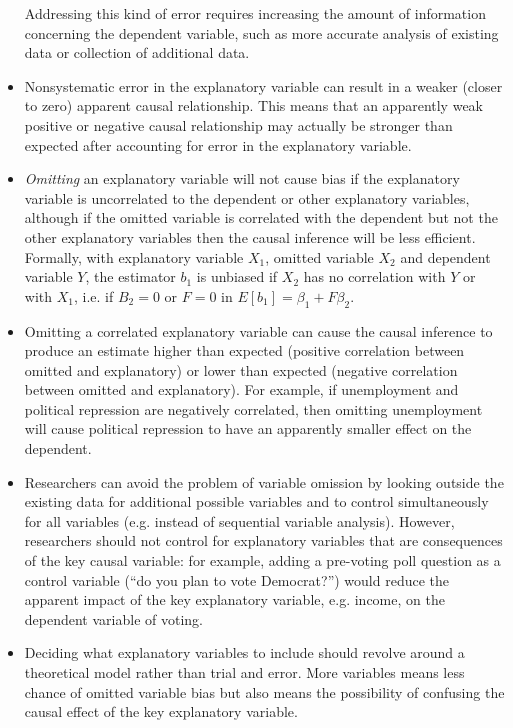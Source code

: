 \documentclass[11pt,letterpaper]{article}
\begin{document}
\begin{itemize}
Addressing this kind of error requires increasing the amount of information concerning the dependent variable, such as more accurate analysis of existing data or collection of additional data. 
\item Nonsystematic error in the explanatory variable can result in a weaker (closer to zero) apparent causal relationship.
This means that an apparently weak positive or negative causal relationship may actually be stronger than expected after accounting for error in the explanatory variable.
\item \emph{Omitting} an explanatory variable will not cause bias if the explanatory variable is uncorrelated to the dependent or other explanatory variables, although if the omitted variable is correlated with the dependent but not the other explanatory variables then the causal inference will be less efficient. Formally, with explanatory variable $X_{1}$, omitted variable $X_{2}$ and dependent variable $Y$, the estimator $b_{1}$ is unbiased if $X_{2}$ has no correlation with $Y$ or with $X_{1}$, i.e. if $B_{2}=0$ or $F=0$ in $E[b_{1}] = \beta_{1} + F\beta_{2}$.
\item Omitting a correlated explanatory variable can cause the causal inference to produce an estimate higher than expected (positive correlation between omitted and explanatory) or lower than expected (negative correlation between omitted and explanatory). For example, if unemployment and political repression are negatively correlated, then omitting unemployment will cause political repression to have an apparently smaller effect on the dependent. 
\item Researchers can avoid the problem of variable omission by looking outside the existing data for additional possible variables and to control simultaneously for all variables (e.g. instead of sequential variable analysis). However, researchers should not control for explanatory variables that are consequences of the key causal variable: for example, adding a pre-voting poll question as a control variable (``do you plan to vote Democrat?'') would reduce the apparent impact of the key explanatory variable, e.g. income, on the dependent variable of voting.
\item Deciding what explanatory variables to include should revolve around a theoretical model rather than trial and error. More variables means less chance of omitted variable bias but also means the possibility of confusing the causal effect of the key explanatory variable.

\end{itemize}
\end{document}
